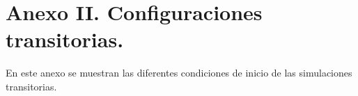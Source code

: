 \section*{Anexo II. Configuraciones transitorias.}
En este anexo se muestran las diferentes condiciones de inicio de las simulaciones transitorias. 


